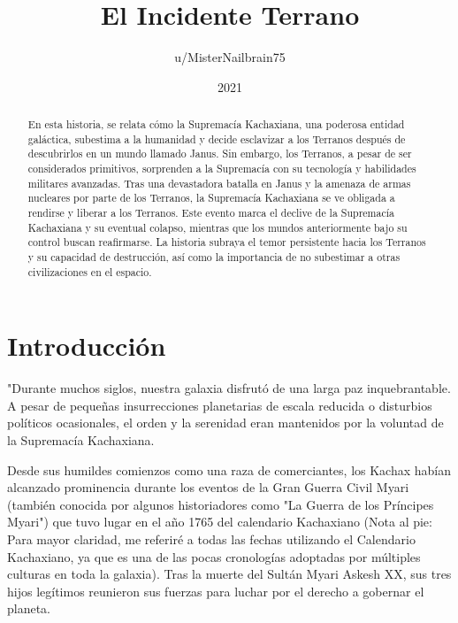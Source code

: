 \documentclass[spanish,12pt,a4paper,oneside,titlepage, twocolumn]{article}
\title{El Incidente Terrano}
\author{u/MisterNailbrain75}
\date{2021}
\begin{document}
    \maketitle

    \begin{abstract}
        En esta historia, se relata cómo la Supremacía Kachaxiana, una poderosa entidad galáctica, subestima a la humanidad y decide esclavizar a los Terranos después de descubrirlos en un mundo llamado Janus. Sin embargo, los Terranos, a pesar de ser considerados primitivos, sorprenden a la Supremacía con su tecnología y habilidades militares avanzadas. Tras una devastadora batalla en Janus y la amenaza de armas nucleares por parte de los Terranos, la Supremacía Kachaxiana se ve obligada a rendirse y liberar a los Terranos. Este evento marca el declive de la Supremacía Kachaxiana y su eventual colapso, mientras que los mundos anteriormente bajo su control buscan reafirmarse. La historia subraya el temor persistente hacia los Terranos y su capacidad de destrucción, así como la importancia de no subestimar a otras civilizaciones en el espacio.
    \end{abstract}

    \section*{\centering Introducción}

    "Durante muchos siglos, nuestra galaxia disfrutó de una larga paz inquebrantable. A pesar de pequeñas insurrecciones planetarias de escala reducida o disturbios políticos ocasionales, el orden y la serenidad eran mantenidos por la voluntad de la Supremacía Kachaxiana.

    Desde sus humildes comienzos como una raza de comerciantes, los Kachax habían alcanzado prominencia durante los eventos de la Gran Guerra Civil Myari (también conocida por algunos historiadores como "La Guerra de los Príncipes Myari") que tuvo lugar en el año 1765 del calendario Kachaxiano (Nota al pie: Para mayor claridad, me referiré a todas las fechas utilizando el Calendario Kachaxiano, ya que es una de las pocas cronologías adoptadas por múltiples culturas en toda la galaxia). Tras la muerte del Sultán Myari Askesh XX, sus tres hijos legítimos reunieron sus fuerzas para luchar por el derecho a gobernar el planeta.
\end{document}
